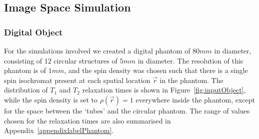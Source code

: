 


\subsection{Image Space Simulation}
\label{method:imagespace}

\subsubsection{Digital Object}

For the simulations involved we created a digital phantom of $80mm$ in diameter, consisting of 12 circular structures of $5mm$ in diameter.
The resolution of this phantom is of $1mm$, and the spin density was chosen such that there is a single spin isochromat present at each spatial location $\vec{r}$ in the phantom.
The distribution of $T_1$ and $T_2$ relaxation times is shown in Figure~\ref{fig:inputObject}, while the spin density is set to $\rho(\vec{r}) = 1$ everywhere inside the phantom, except for the space between the `tubes' and the circular phantom.
The range of values chosen for the relaxation times are also summarised in Appendix~\ref{appendixlabelPhantom}.

